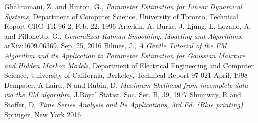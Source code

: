 \documentclass[12pt,leqno]{article}
\begin{document}

\begin{thebibliography}{9}
  Ghahramani, Z. and Hinton, G.,
  \emph{Parameter Estimation for Linear Dynamical Systems},
  Department of Computer Science, University of Toronto,
  Technical Report CRG-TR-96-2,
  Feb. 22, 1996
  Aravkin, A. Burke, J. Ljung, L. Lozano, A. and Pillonetto, G.,
  \emph{Generalized Kalman Smoothing: Modeling and Algorithms},
  arXiv:1609.06369,
  Sep. 25, 2016
  Bilmes, J.,
   \emph{A Gentle Tutorial of the EM Algorithm and its Application to Parameter Estimation
    for Gaussian Maixture and Hidden Markov Models},
  Department of Electrical Engineering and Computer Science, University of California, Berkeley,
  Technical Report 97-021
  April, 1998
  Dempster, A Laird, N and Rubin, D,
   \emph{Maximum-likelihood from incomplete data via the EM algorithm},
  J.Royal Statist. Soc. Ser. B, 39,
  1977
  Shumway, R and Stoffer, D,
  \emph{Time Series Analysis and Its Applications, 3rd Ed. (Blue printing)}
  Springer, New York 2016
    
\end{thebibliography}
 
\end{document}
